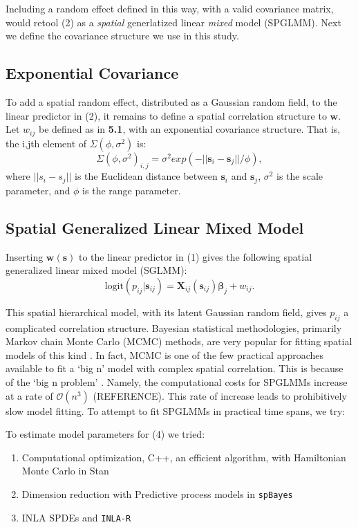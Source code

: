 \documentclass{article}
\begin{document}
Including a random effect defined in this way, with a valid covariance matrix, would retool (2) as a {\it spatial} generlatized linear {\it mixed} model (SPGLMM). Next we define the covariance structure we use in this study.

\subsection{Exponential Covariance}
To add a spatial random effect, distributed as a Gaussian random field, to the linear predictor in (2), it remains to define a spatial correlation structure to $\pmb{w}$. Let $w_{ij}$ be defined as in {\bf 5.1}, with an exponential covariance structure. That is, the i,jth element of $\Sigma(\phi, \sigma^{2})$ is:
\begin{equation}
\Sigma(\phi, \sigma^{2})_{i,j} = \sigma^{2} exp(-||\pmb{s}_{i} - \pmb{s}_{j}||/\phi),
\end{equation}
where $||s_{i} - s_{j}||$ is the Euclidean distance between $\pmb{s}_{i}$ and $\pmb{s}_{j}$, $\sigma^{2}$ is the scale parameter, and $\phi$ is the range parameter.

\subsection{Spatial Generalized Linear Mixed Model}
Inserting $\pmb{w}(\pmb{s})$ to the linear predictor in (1) gives the following spatial generalized linear mixed model (SGLMM):
\begin{equation}
\text{logit}(p_{ij}|\pmb{s}_{ij}) = \pmb{X}_{ij}(\pmb{s}_{ij}) \pmb{\beta}_{j} + w_{ij}.
\end{equation}

This spatial hierarchical model, with its latent Gaussian random field, gives $p_{ij}$ a complicated correlation structure. Bayesian statistical methodologies, primarily Markov chain Monte Carlo (MCMC) methods, are very popular for fitting spatial models of this kind \citep{Banerjee2014}. In fact, MCMC is one of the few practical approaches available to fit a `big n' model with complex spatial correlation. This is because of the `big n problem' \citep{Lindgren2011}. Namely, the computational costs for SPGLMMs increase at a rate of $\mathcal{O}(n^{3})$ (REFERENCE). This rate of increase leads to prohibitively slow model fitting. To attempt to fit SPGLMMs in practical time spans, we try: 

To estimate model parameters for (4) we tried:
\begin{enumerate}
\item Computational optimization, C++, an efficient algorithm, with Hamiltonian Monte Carlo in Stan
\item Dimension reduction with Predictive process models in \verb|spBayes|
\item INLA SPDEs and \verb|INLA-R|
\end{enumerate}
\end{document}

